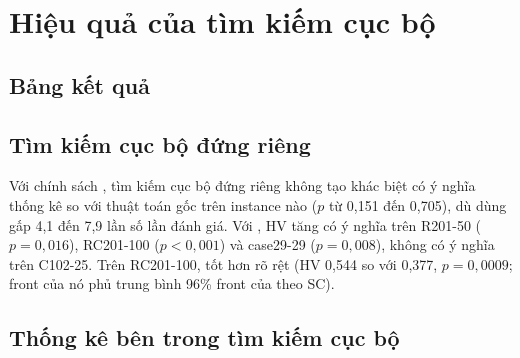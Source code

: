 \section{Hiệu quả của tìm kiếm cục bộ}

\subsection{Bảng kết quả}

\begin{table}[H]
\centering
\caption{Kết quả trên C102-25 (10 seed; $G$ là số thế hệ; $p$ so với Gốc 200 thế hệ)}
\label{tab:main-c102}
\resizebox{\textwidth}{!}{}
\end{table}

\begin{table}[H]
\centering
\caption{Kết quả trên R201-50}
\label{tab:main-r201}
\resizebox{\textwidth}{!}{}
\end{table}

\begin{table}[H]
\centering
\caption{Kết quả trên RC201-100}
\label{tab:main-rc201}
\resizebox{\textwidth}{!}{}
\end{table}

\begin{table}[H]
\centering
\caption{Kết quả trên case29-29}
\label{tab:main-case29}
\resizebox{\textwidth}{!}{}
\end{table}

\subsection{Tìm kiếm cục bộ đứng riêng}

Với chính sách , tìm kiếm cục bộ đứng riêng không tạo khác biệt có ý nghĩa thống kê so với
thuật toán gốc trên instance nào ($p$ từ 0,151 đến 0,705), dù dùng gấp 4,1 đến 7,9 lần số lần đánh giá.
Với , HV tăng có ý nghĩa trên R201-50 ($p = 0{,}016$), RC201-100 ($p < 0{,}001$) và
case29-29 ($p = 0{,}008$), không có ý nghĩa trên C102-25. Trên RC201-100,  tốt
hơn  rõ rệt (HV 0,544 so với 0,377, $p = 0{,}0009$; front của nó phủ trung bình 96\% front
của  theo SC).

\subsection{Thống kê bên trong tìm kiếm cục bộ}
\label{sec:ls-stats}

